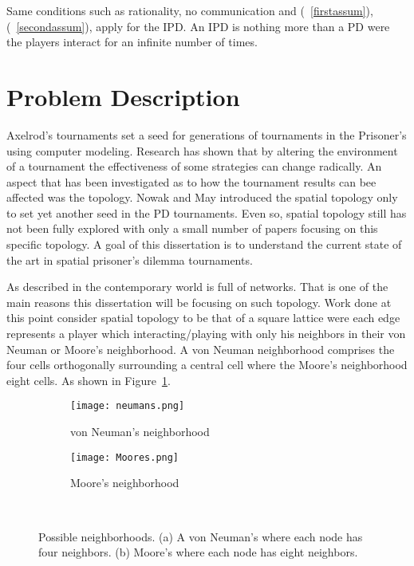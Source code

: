 Same conditions such as rationality, no communication and (~\ref{firstassum}),
(~\ref{secondassum}),
apply for the IPD. An IPD is nothing more than a PD were
the players interact for an infinite number of times.

\section{Problem Description}

Axelrod's tournaments set a seed for generations of tournaments in the
Prisoner's using computer modeling. Research has shown that by altering the
environment of a tournament the effectiveness of some strategies can change
radically. An aspect that has been investigated as to how the tournament results
can bee affected was the topology. Nowak and May \cite{Nowak1992} introduced the spatial topology
only to set yet another seed in the PD tournaments. Even so, spatial topology
still has not been fully explored with only a small number of papers focusing on
this specific topology.  A goal of this dissertation is to understand the
current state of the art in spatial prisoner’s dilemma tournaments.

As described in \cite{Maschler} the contemporary world is full of networks. That
is one of the main reasons this dissertation will be focusing on such topology.
Work done at this point consider spatial topology to be that of a square lattice
were each edge represents a player which interacting/playing with only his
neighbors in their von Neuman or Moore's neighborhood. A von Neuman neighborhood
comprises the four cells orthogonally surrounding a central cell where the
Moore's neighborhood eight cells. As shown in Figure~\ref{fig:neighborhood}.

\begin{figure}[h]
\centering
    \begin{subfigure}[t]{0.40\textwidth}
    \centering
        \texttt{[image: neumans.png]}
    \caption{von Neuman's neighborhood}
    \end{subfigure}
\hfill
    \begin{subfigure}[t]{0.40\textwidth}\centering
    \centering
        \texttt{[image: Moores.png]}
    \caption{Moore's neighborhood}
    \end{subfigure}
~
\caption{Possible neighborhoods. (a) A von Neuman's where each node has four neighbors.
(b) Moore's where each node has eight neighbors.}
\label{fig:neighborhood}
\end{figure}

